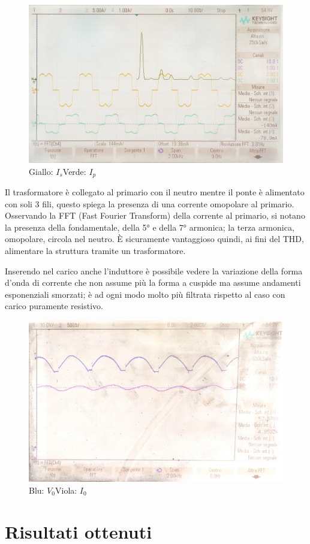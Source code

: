 \documentclass[a4paper,10pt]{article}
\begin{document}
\begin{figure}[H]
 \centering
 \includegraphics[keepaspectratio=true,width=0.9\linewidth]
 {correnti_FFT_2_neg.jpg}
 \caption{Giallo: \(I_s\)\quad Verde: \(I_p\)}
 \label{fig:correnti_fase_carico_R}
 \end{figure}
Il trasformatore è collegato al primario con il neutro mentre il ponte è 
alimentato con soli 3 fili, questo spiega la presenza di una corrente
omopolare al primario. Osservando la FFT (Fast Fourier Transform) della corrente al 
primario, si notano la 
presenza della fondamentale, della \ang{5} e della \ang{7} armonica; la terza 
armonica, omopolare, circola nel neutro. È sicuramente vantaggioso quindi, ai fini 
del THD, alimentare la struttura tramite un trasformatore.
\medskip

Inserendo nel carico anche l'induttore è possibile vedere la variazione della forma
d'onda di corrente che non assume più la forma a cuspide ma assume andamenti 
esponenziali smorzati; è ad ogni modo molto più filtrata rispetto al caso con carico
puramente resistivo.


\begin{figure}[H]
 \centering
 \includegraphics[keepaspectratio=true,width=0.9\linewidth]
 {tensione_e_corrente_3_neg.JPG}
 \caption{Blu: \(V_0\)\quad Viola: \(I_0\)}
 \label{fig:tensioni_carico_RL}
 \end{figure}

\section{Risultati ottenuti}
\end{document}
